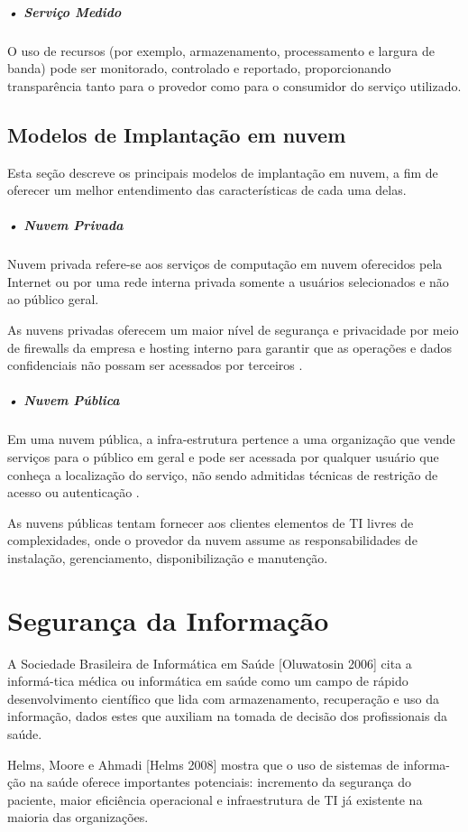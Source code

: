 \documentclass[portuguese,oneside]{tcc}
\begin{document}
\subparagraph{• Serviço Medido}
O uso de recursos (por exemplo, armazenamento, processamento e largura de banda) pode ser monitorado, controlado e reportado, proporcionando transparência tanto para o provedor como para o consumidor do serviço utilizado.

\subsection{Modelos de Implantação em nuvem}
Esta seção descreve os principais modelos de implantação em nuvem, a fim de oferecer um melhor entendimento das características de cada uma delas. 

\subparagraph{• Nuvem Privada}
Nuvem privada refere-se aos serviços de computação em nuvem oferecidos pela Internet ou por uma rede interna privada somente a usuários selecionados e não ao público geral.

As nuvens privadas oferecem um maior nível de segurança e privacidade por meio de firewalls da empresa e hosting interno para garantir que as operações e dados confidenciais não possam ser acessados por terceiros \cite{OQUEENUVEM}.

\subparagraph{• Nuvem Pública}
Em uma nuvem pública, a infra-estrutura pertence a uma  organização que vende serviços para o público em geral e pode  ser acessada por qualquer usuário que conheça a localização do  serviço, não sendo admitidas técnicas de restrição de acesso ou autenticação \cite{COMPUTACAOEMNUVEM}.

As nuvens públicas tentam fornecer aos clientes elementos de  TI livres de complexidades, onde o provedor da nuvem assume  as responsabilidades de instalação, gerenciamento, disponibilização e manutenção.  

\section{Segurança da Informação}
A Sociedade Brasileira de Informática em Saúde [Oluwatosin 2006] cita a informá-tica médica ou informática em saúde como um campo de rápido desenvolvimento científico que lida com armazenamento, recuperação e uso da informação, dados estes que auxiliam na tomada de decisão dos profissionais da saúde.

Helms, Moore e Ahmadi [Helms 2008] mostra que o uso de sistemas de informa-ção na saúde oferece importantes potenciais: incremento da segurança do paciente, maior eficiência operacional e infraestrutura de TI já existente na maioria das organizações.
\end{document}

